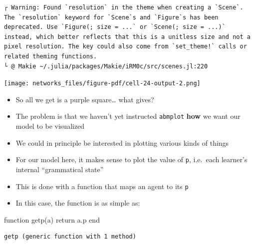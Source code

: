 \documentclass[
  letterpaper,
  DIV=11,
  numbers=noendperiod]{scrartcl}
\newenvironment{Shaded}{\begin{snugshade}}{\end{snugshade}}
\newcommand{\ControlFlowTok}[1]{\textcolor[rgb]{0.00,0.23,0.31}{#1}}
\newcommand{\FunctionTok}[1]{\textcolor[rgb]{0.28,0.35,0.67}{#1}}
\newcommand{\KeywordTok}[1]{\textcolor[rgb]{0.00,0.23,0.31}{#1}}
\newcommand{\NormalTok}[1]{\textcolor[rgb]{0.00,0.23,0.31}{#1}}
\providecommand{\tightlist}{%
  \setlength{\itemsep}{0pt}\setlength{\parskip}{0pt}}\usepackage{longtable,booktabs,array}
\begin{document}
\begin{verbatim}
┌ Warning: Found `resolution` in the theme when creating a `Scene`. The `resolution` keyword for `Scene`s and `Figure`s has been deprecated. Use `Figure(; size = ...` or `Scene(; size = ...)` instead, which better reflects that this is a unitless size and not a pixel resolution. The key could also come from `set_theme!` calls or related theming functions.
└ @ Makie ~/.julia/packages/Makie/iRM0c/src/scenes.jl:220
\end{verbatim}

\texttt{[image: networks\_files/figure-pdf/cell-24-output-2.png]}

\begin{itemize}
\tightlist
\item
  So all we get is a purple square\ldots{} what gives?
\item
  The problem is that we haven't yet instructed \texttt{abmplot}
  \textbf{how} we want our model to be visualized
\item
  We could in principle be interested in plotting various kinds of
  things
\item
  For our model here, it makes sense to plot the value of \texttt{p},
  i.e.~each learner's internal ``grammatical state''
\item
  This is done with a function that maps an agent to its \texttt{p}
\end{itemize}

\begin{itemize}
\tightlist
\item
  In this case, the function is as simple as:
\end{itemize}

\begin{Shaded}
\begin{Highlighting}[]
\KeywordTok{function} \FunctionTok{getp}\NormalTok{(a)}
  \ControlFlowTok{return}\NormalTok{ a.p}
\KeywordTok{end}
\end{Highlighting}
\end{Shaded}

\begin{verbatim}
getp (generic function with 1 method)
\end{verbatim}
\end{document}
